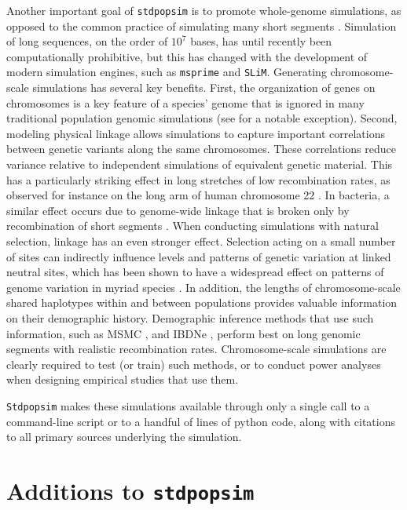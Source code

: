 \documentclass[hidelinks]{article}
\newcommand{\Stdpopsim}{\texttt{Stdpopsim}\xspace}
\newcommand{\stdpopsim}{\texttt{stdpopsim}\xspace}
\begin{document}
Another important goal of \stdpopsim is to promote whole-genome simulations,
as opposed to the common practice of simulating many short segments \citep[see, e.g.,][]{harris2016genetic}.
Simulation of long sequences, on the order of $10^7$ bases,
has until recently been computationally prohibitive,
but this has changed with the development of modern simulation engines,
such as \texttt{msprime} and \texttt{SLiM}.
Generating chromosome-scale simulations has several key benefits.
First, the organization of genes on chromosomes is a key feature of a species' genome that is ignored in many traditional population genomic simulations
 (see \cite{schrider2020background} for a notable exception).
Second, modeling physical linkage allows simulations to capture
important correlations between genetic variants along the same chromosomes.
These correlations reduce variance relative to independent simulations of equivalent genetic material.
This has a particularly striking effect in long stretches of low recombination rates,
as observed for instance on the long arm of human chromosome 22 \citep{Dawson2002}.
In bacteria, a similar effect occurs due to genome-wide linkage that is broken only
by recombination of short segments \citep{Didelot2010}.
When conducting simulations with natural selection, linkage has
an even stronger effect. Selection acting on a small number of sites can
indirectly influence levels and patterns of genetic variation at linked neutral sites,
which has been shown to have a widespread
effect on patterns of genome variation in myriad species
\citep[e.g.,][]{McVicker2009,Charlesworth2012}. 
In addition, the lengths of chromosome-scale shared haplotypes within and
between populations provides valuable information on their demographic history.
Demographic inference methods that use such information,
such as MSMC \citep{Schiffels2020}, and IBDNe \citep{browning2015accurate},
perform best on long genomic segments with realistic recombination rates.
Chromosome-scale simulations are clearly required to test (or train) such methods,
or to conduct power analyses when designing empirical studies that use them.

\Stdpopsim makes these simulations available
through only a single call to a command-line script
or to a handful of lines of python code,
along with citations to all primary sources underlying the simulation.


\section*{Additions to \stdpopsim}
    \label{sec:expanded-catalog}
\end{document}
